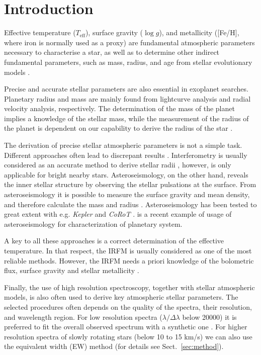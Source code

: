 \documentclass{aa}
\begin{document}
\section{Introduction}
\label{sec:introduction}

Effective temperature ($T_\mathrm{eff}$), surface gravity ($\log g$),
and metallicity ([Fe/H], where iron is normally used as a proxy)
are fundamental atmospheric parameters necessary to characterise a
star, as well as to determine other indirect fundamental parameters,
such as mass, radius, and age from stellar evolutionary models
\citep[e.g.][]{Girardi2000}.

Precise and accurate stellar parameters are also essential in
exoplanet searches. Planetary radius and mass are mainly found from
lightcurve analysis and radial velocity analysis, respectively. The
determination of the mass of the planet implies a knowledge of the
stellar mass, while the measurement of the radius of the planet
is dependent on our capability to derive the radius of the star
\citep{Ammler2009,Torres2008,Torres2012}.

The derivation of precise stellar atmospheric parameters is not a
simple task. Different approaches often lead to discrepant results
\citep[see e.g.][]{Santos13}. Interferometry is usually considered as an
accurate method to derive stellar radii \citep[e.g.][]{Boyajian2012},
however, is only applicable for bright nearby stars. Asteroseismology,
on the other hand, reveals the inner stellar structure by observing
the stellar pulsations at the surface. From asteroseismology it is possible
to measure the surface gravity and mean density, and therefore calculate the
mass and radius \citep[e.g.][]{Kjeldsen1995}. Asteroseismology has
been tested to great extent with e.g. \emph{Kepler} and \emph{CoRoT}
\citep{Michel2008,Huber2011,Huber2012}. \cite{Campante2015} is a recent
example of usage of asteroseismology for characterization of planetary
system.

A key to all these approaches is a correct determination
of the effective temperature. In that respect, the IRFM
is usually considered as one of the most reliable methods. However, the IRFM
needs a priori knowledge of the bolometric flux, surface gravity and
stellar metallicity \citep{Blackwell1977,Ramirez2005b,Casagrande2010}.

Finally, the use of high resolution spectroscopy, together with stellar
atmospheric models, is also often used to derive key atmospheric stellar
parameters. The selected procedures often depends on the quality of the
spectra, their resolution, and wavelength region. For low resolution
spectra ($\lambda/\Delta\lambda$ below 20000) it is preferred to
fit the overall observed spectrum with a synthetic one \citep[see
e.g.][]{Recio2006}. For higher resolution spectra of slowly rotating
stars (below 10 to 15 \si{km/s}) we can also use the equivalent width (EW)
method (for details see Sect.~\ref{sec:method}).
\end{document}
